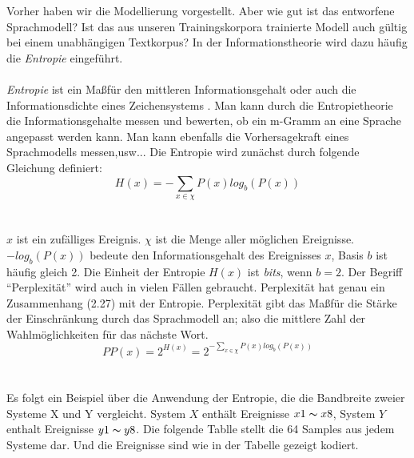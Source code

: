 Vorher haben wir die Modellierung vorgestellt. Aber wie gut ist das entworfene Sprachmodell? Ist das aus unseren Trainingskorpora trainierte Modell auch g\"ultig bei einem unabh\"angigen Textkorpus? In der Informationstheorie wird dazu h\"aufig die \emph{Entropie}  eingef\"uhrt.
\\
\\
\emph{Entropie} ist ein Ma\ss \space f\"ur den mittleren Informationsgehalt oder auch die Informationsdichte eines Zeichensystems \cite{int_entropie}. Man kann durch die Entropietheorie die Informationsgehalte messen und bewerten, ob ein m-Gramm an eine Sprache angepasst werden kann. Man kann ebenfalls die Vorhersagekraft eines Sprachmodells messen,usw..\cite{book_speech}.
Die Entropie wird zun\"achst durch folgende Gleichung definiert:
\begin{equation}
\label{equation:bewertung_01}
H(x)=-\sum_{x\in\chi}P(x)log_{b}(P(x))
\end{equation}
\\
\\
$x$ ist ein zuf\"alliges Ereignis. $\chi$ ist die Menge aller m\"oglichen Ereignisse. $-log_{b}(P(x))$ bedeute den Informationsgehalt des Ereignisses $x$, Basis $b$ ist h\"aufig gleich 2. Die Einheit der Entropie $H(x)$ ist \emph{bits}, wenn $b=2$.
Der Begriff "`Perplexit\"at"' wird auch in vielen F\"allen gebraucht. Perplexit\"at hat genau ein Zusammenhang (2.27) mit der Entropie. Perplexit\"at gibt das Ma\ss \space f\"ur die St\"arke der Einschr\"ankung durch das Sprachmodell an; also die mittlere Zahl der Wahlm\"oglichkeiten f\"ur das n\"achste Wort.
\begin{equation}
\label{equation:bewertung_02}
PP(x)=2^{H(x)}=2^{-\sum_{x\in\chi}P(x)log_{b}(P(x))}
\end{equation}
\\
\\
Es folgt ein Beispiel \"uber die Anwendung der Entropie, die die Bandbreite zweier Systeme X und Y vergleicht. System $X$ enth\"alt Ereignisse $x1\thicksim x8$, System $Y$ enthalt Ereignisse $y1\thicksim y8$. Die folgende Tablle stellt die 64 Samples aus jedem Systeme dar. Und die Ereignisse sind wie in der Tabelle gezeigt kodiert.
